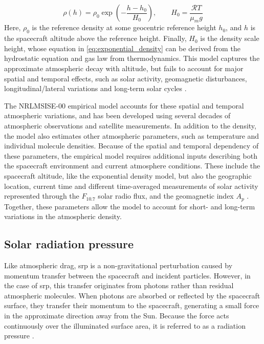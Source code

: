 \begin{equation}
    \rho(h) = \rho_0 \exp\!\left( -\frac{h - h_0}{H_0} \right), \qquad H_0 = \frac{\mathcal{R}T}{\mu_m g}
\label{eq:exponential_density}
\end{equation}
Here, $\rho_0$ is the reference density at some geocentric reference height $h_0$, and $h$ is the spacecraft altitude above the reference height. Finally, $H_0$ is the density scale height, whose equation in \ref{eq:exponential_density} can be derived from the hydrostatic equation and gas law from thermodynamics. This model captures the approximate atmospheric decay with altitude, but fails to account for major spatial and temporal effects, such as solar activity, geomagnetic disturbances, longitudinal/lateral variations and long-term solar cycles \cite{ montenbruck2000}. 

The NRLMSISE-00 empirical model accounts for these spatial and temporal atmospheric variations, and has been developed using several decades of atmospheric observations and satellite measurements. In addition to the density, the model also estimates other atmospheric parameters, such as temperature and individual molecule densities. Because of the spatial and temporal dependency of these parameters, the empirical model requires additional inputs describing both the spacecraft environment and current atmosphere conditions. These include the spacecraft altitude, like the exponential density model, but also the geographic location, current time and different time-averaged measurements of solar activity represented through the $F_{10.7}$ solar radio flux, and the geomagnetic index $A_p$ \cite{Picone2002MSIS}. Together, these parameters allow the model to account for short- and long-term variations in the atmospheric density.



\subsection{Solar radiation pressure}
Like atmospheric drag, \gls{srp} is a non-gravitational perturbation caused by momentum transfer between the spacecraft and incident particles. However, in the case of \gls{srp}, this transfer originates from photons rather than residual atmospheric molecules. When photons are absorbed or reflected by the spacecraft surface, they transfer their momentum to the spacecraft, generating a small force in the approximate direction away from the Sun. Because the force acts continuously over the illuminated surface area, it is referred to as a radiation pressure \cite{montenbruck2000, hystad2025}. 

